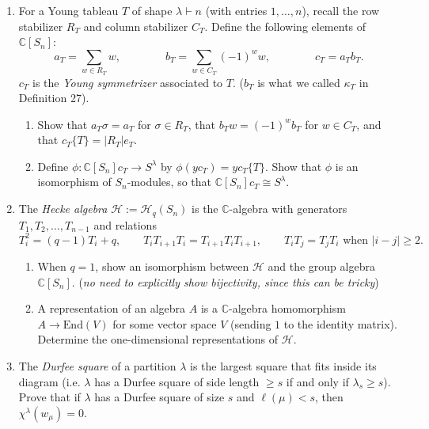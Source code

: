 \documentclass[12pt]{article}
\newcommand{\C}{\mathbb{C}}
\newcommand{\End}{\text{End}}
\begin{document}
\begin{enumerate}
\item[4.] For a Young tableau $T$ of shape $\lambda \vdash n$ (with entries $1,\ldots,n$), recall the row stabilizer $R_T$ and column stabilizer $C_T$. Define the following elements of $\C[S_n]$:
\[
a_T = \sum_{w\in R_T} w, \qquad\qquad b_T = \sum_{w\in C_T} (-1)^w w, \qquad\qquad c_T = a_T b_T.
\]
$c_T$ is the \emph{Young symmetrizer} associated to $T$. ($b_T$ is what we called $\kappa_T$ in Definition 27).

\begin{enumerate}
\item Show that $a_T \sigma = a_T$ for $\sigma \in R_T$, that $b_T w = (-1)^w b_T$ for $w\in C_T$, and that $c_T\{T\} = |R_T| e_T$.
\item Define $\phi: \C[S_n]c_T \to S^\lambda$ by $\phi(yc_T) = yc_T\{T\}$. Show that $\phi$ is an isomorphism of $S_n$-modules, so that $\C[S_n]c_T \cong S^\lambda$.
\end{enumerate}


\item[5.] The \emph{Hecke algebra} $\mathcal{H} 
:= \mathcal{H}_q(S_n)$ is the $\C$-algebra with generators $T_1,T_2,\ldots,T_{n-1}$ and relations
\[
T_i^2 = (q-1)T_i + q,\qquad T_iT_{i+1}T_i = T_{i+1}T_iT_{i+1}, \qquad T_iT_j=T_jT_i \text{ when } |i-j|\ge 2.
\]

\begin{enumerate}
    \item When $q=1$, show an isomorphism between $\mathcal{H}$ and the group algebra $\C[S_n]$. (\emph{no need to explicitly show bijectivity, since this can be tricky})
    \item A representation of an algebra $A$ is a $\C$-algebra homomorphism $A\to\End(V)$ for some vector space $V$ (sending $1$ to the identity matrix). Determine the one-dimensional representations of $\mathcal{H}$.
\end{enumerate}


\item[6.] The \emph{Durfee square} of a partition $\lambda$ is the largest square that fits inside its diagram (i.e. $\lambda$ has a Durfee square of side length $\ge s$ if and only if $\lambda_s\ge s$). Prove that if $\lambda$ has a Durfee square of size $s$ and $\ell(\mu)<s$, then $\chi^\lambda(w_\mu)=0$.

\end{enumerate}
\end{document}
